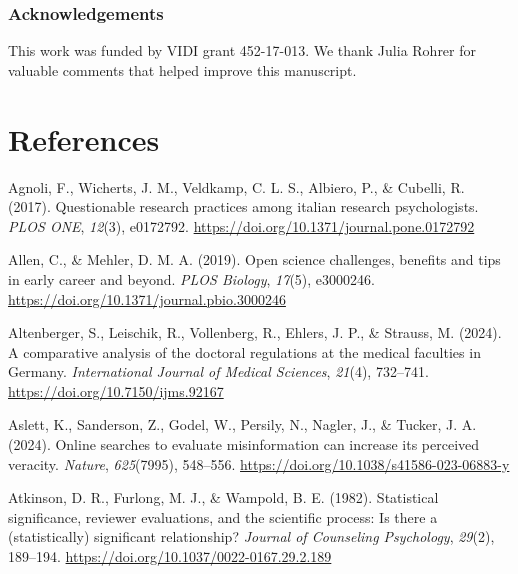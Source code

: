 \documentclass[
  ,man,mask,floatsintext]{apa6}
\newlength{\cslhangindent}
\newlength{\cslentryspacingunit} %
\newenvironment{CSLReferences}[2] %
 {%
  \setlength{\parindent}{0pt}
  \ifodd #1
  \let\oldpar\par
  \def\par{\hangindent=\cslhangindent\oldpar}
  \fi
  \setlength{\parskip}{#2\cslentryspacingunit}
 }%
 {}
\begin{document}
\hypertarget{acknowledgements}{%
\subsubsection{Acknowledgements}\label{acknowledgements}}

This work was funded by VIDI grant 452-17-013. We thank Julia Rohrer for valuable comments that helped improve this manuscript.

\hypertarget{references}{%
\section{References}\label{references}}

\setlength{\parindent}{-0.2in}
\setlength{\leftskip}{0.2in}


\hypertarget{refs}{}
\begin{CSLReferences}{1}{0}
\leavevmode{}%
Agnoli, F., Wicherts, J. M., Veldkamp, C. L. S., Albiero, P., \& Cubelli, R. (2017). Questionable research practices among italian research psychologists. \emph{PLOS ONE}, \emph{12}(3), e0172792. \url{https://doi.org/10.1371/journal.pone.0172792}

\leavevmode{}%
Allen, C., \& Mehler, D. M. A. (2019). Open science challenges, benefits and tips in early career and beyond. \emph{PLOS Biology}, \emph{17}(5), e3000246. \url{https://doi.org/10.1371/journal.pbio.3000246}

\leavevmode{}%
Altenberger, S., Leischik, R., Vollenberg, R., Ehlers, J. P., \& Strauss, M. (2024). A comparative analysis of the doctoral regulations at the medical faculties in {Germany}. \emph{International Journal of Medical Sciences}, \emph{21}(4), 732--741. \url{https://doi.org/10.7150/ijms.92167}

\leavevmode{}%
Aslett, K., Sanderson, Z., Godel, W., Persily, N., Nagler, J., \& Tucker, J. A. (2024). Online searches to evaluate misinformation can increase its perceived veracity. \emph{Nature}, \emph{625}(7995), 548--556. \url{https://doi.org/10.1038/s41586-023-06883-y}

\leavevmode{}%
Atkinson, D. R., Furlong, M. J., \& Wampold, B. E. (1982). Statistical significance, reviewer evaluations, and the scientific process: {Is} there a (statistically) significant relationship? \emph{Journal of Counseling Psychology}, \emph{29}(2), 189--194. \url{https://doi.org/10.1037/0022-0167.29.2.189}


\end{CSLReferences}
\end{document}
